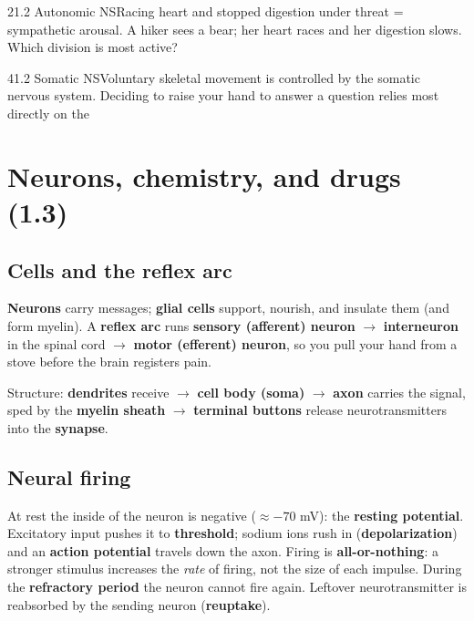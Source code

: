 \documentclass[11pt]{article}
\begin{document}
\begin{q}{2}{1.2 Autonomic NS}{Racing heart and stopped digestion under threat = sympathetic arousal.}
A hiker sees a bear; her heart races and her digestion slows. Which division is most active?
\end{q}

\begin{q}{4}{1.2 Somatic NS}{Voluntary skeletal movement is controlled by the somatic nervous system.}
Deciding to raise your hand to answer a question relies most directly on the
\end{q}

\section{Neurons, chemistry, and drugs (1.3)}

\subsection{Cells and the reflex arc}
\textbf{Neurons} carry messages; \textbf{glial cells} support, nourish, and insulate them (and form myelin). A \textbf{reflex arc} runs \textbf{sensory (afferent) neuron} \(\rightarrow\) \textbf{interneuron} in the spinal cord \(\rightarrow\) \textbf{motor (efferent) neuron}, so you pull your hand from a stove before the brain registers pain.

Structure: \textbf{dendrites} receive \(\rightarrow\) \textbf{cell body (soma)} \(\rightarrow\) \textbf{axon} carries the signal, sped by the \textbf{myelin sheath} \(\rightarrow\) \textbf{terminal buttons} release neurotransmitters into the \textbf{synapse}.

\subsection{Neural firing}
At rest the inside of the neuron is negative (\(\approx -70\) mV): the \textbf{resting potential}. Excitatory input pushes it to \textbf{threshold}; sodium ions rush in (\textbf{depolarization}) and an \textbf{action potential} travels down the axon. Firing is \textbf{all-or-nothing}: a stronger stimulus increases the \emph{rate} of firing, not the size of each impulse. During the \textbf{refractory period} the neuron cannot fire again. Leftover neurotransmitter is reabsorbed by the sending neuron (\textbf{reuptake}).
\end{document}
